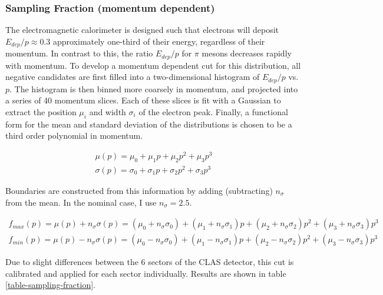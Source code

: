 \subsubsection{Sampling Fraction (momentum dependent)}
The electromagnetic calorimeter is designed such that electrons will deposit $E_{dep}/p \approx 0.3$ approximately one-third of their energy, regardless of their momentum.  In contrast to this, the ratio $E_{dep}/p$ for $\pi$ mesons decreases rapidly with momentum.  To develop a momentum dependent cut for this distribution, all negative candidates are first filled into a two-dimensional histogram of $E_{dep}/p$ vs. $p$.  The histogram is then binned more coarsely in momentum, and projected into a series of 40 momentum slices.  Each of these slices is fit with a Gaussian to extract the position $\mu_i$ and width $\sigma_i$ of the electron peak.  Finally, a functional form for the mean and standard deviation of the distributions is chosen to be a third order polynomial in momentum.

\begin{eqnarray}
  \mu (p) = \mu_0 + \mu_1 p + \mu_2 p^2 + \mu_3 p^3 \\
  \sigma (p) = \sigma_0 + \sigma_1 p + \sigma_2 p^2 + \sigma_3 p^3 
\end{eqnarray}    

Boundaries are constructed from this information by adding (subtracting) $n_{\sigma}$ from the mean.  In the nominal case, I use $n_{\sigma} = 2.5$.

\begin{eqnarray}
  f_{max} (p) = \mu (p) + n_{\sigma} \sigma (p) = (\mu_0 + n_{\sigma} \sigma_0) + (\mu_1 + n_{\sigma} \sigma_1)p + (\mu_2 + n_{\sigma} \sigma_2)p^2 + (\mu_3 + n_{\sigma} \sigma_3)p^3 \\
  f_{min} (p) = \mu (p) - n_{\sigma} \sigma (p) = (\mu_0 - n_{\sigma} \sigma_0) + (\mu_1 - n_{\sigma} \sigma_1)p + (\mu_2 - n_{\sigma} \sigma_2)p^2 + (\mu_3 - n_{\sigma} \sigma_3)p^3
\end{eqnarray}

Due to slight differences between the 6 sectors of the CLAS detector, this cut is calibrated and applied for each sector individually.  Results are shown in table \ref{table-sampling-fraction}.



